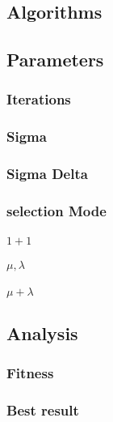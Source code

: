 \documentclass{scrartcl}
\begin{document}
\subsection{Algorithms}


\subsection{Parameters}
\subsubsection{Iterations}
\subsubsection{Sigma} 
\subsubsection{Sigma Delta}

\subsubsection{selection Mode}
\paragraph{$1+1$}

\paragraph{$\mu,\lambda$}

\paragraph{$\mu +\lambda$}


\subsection{Analysis}

\subsubsection{Fitness}

\subsubsection{Best result}
\end{document}
